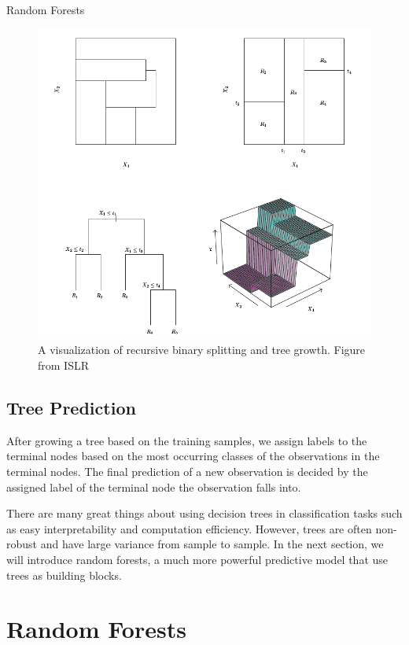 \documentclass[12pt]{pom_thesis}
\begin{document}
\begin{chapter}{Random Forests}
\begin{figure}[h]
    \centering
    \includegraphics[height = 0.7\textwidth, width = \textwidth]{cart.png}
    \caption{A visualization of recursive binary splitting and tree growth. Figure from ISLR \citep{ISLR}}
    \label{cart}
\end{figure}


\subsection{Tree Prediction}
After growing a tree based on the training samples, we assign labels to the terminal nodes based on the most occurring classes of the observations in the terminal nodes. The final prediction of a new observation is decided by the assigned label of the terminal node the observation falls into. 

There are many great things about using decision trees in classification tasks such as easy interpretability and computation efficiency. However, trees are often non-robust and have large variance from sample to sample. In the next section, we will introduce random forests, a much more powerful predictive model that use trees as building blocks.

\section{Random Forests}


\end{chapter}
\end{document}

